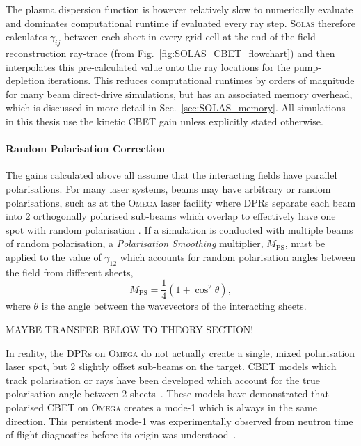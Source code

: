 The plasma dispersion function is however relatively slow to numerically evaluate and dominates computational runtime if evaluated every ray step.
\textsc{Solas} therefore calculates $\gamma_{ij}$ between each sheet in every grid cell at the end of the field reconstruction ray-trace (from Fig.~\ref{fig:SOLAS_CBET_flowchart}) and then interpolates this pre-calculated value onto the ray locations for the pump-depletion iterations.
This reduces computational runtimes by orders of magnitude for many beam direct-drive simulations, but has an associated memory overhead, which is discussed in more detail in Sec.~\ref{sec:SOLAS_memory}.
All simulations in this thesis use the kinetic \ac{CBET} gain unless explicitly stated otherwise.

\paragraph*{Random Polarisation Correction}

The gains calculated above all assume that the interacting fields have parallel polarisations.
For many laser systems, beams may have arbitrary or random polarisations, such as at the \textsc{Omega} laser facility where \ac{DPRs} separate each beam into 2 orthogonally polarised sub-beams which overlap to effectively have one spot with random polarisation \cite{boehly_reduction_1999}.
If a simulation is conducted with multiple beams of random polarisation, a \textit{Polarisation Smoothing} multiplier, $M_{\text{PS}}$, must be applied to the value of $\gamma_{12}$ which accounts for random polarisation angles between the field from different sheets,
\begin{equation}
    \label{eq:polarisation_smoothing}
    M_{\text{PS}} = \frac{1}{4}(1 + \cos^2\theta),
\end{equation}
where $\theta$ is the angle between the wavevectors of the interacting sheets.

MAYBE TRANSFER BELOW TO THEORY SECTION!

In reality, the \ac{DPRs} on \textsc{Omega} do not actually create a single, mixed polarisation laser spot, but 2 slightly offset sub-beams on the target.
\ac{CBET} models which track polarisation or rays have been developed which account for the true polarisation angle between 2 sheets~\cite{edgell_nonuniform_2021,colaitis_3d_2022,colaitis_3d_2023,colaitis_3d_2023-1}.
These models have demonstrated that polarised \ac{CBET} on \textsc{Omega} creates a mode-1 which is always in the same direction.
This persistent mode-1 was experimentally observed from neutron time of flight diagnostics before its origin was understood~\cite{mannion_mitigation_2021}.

